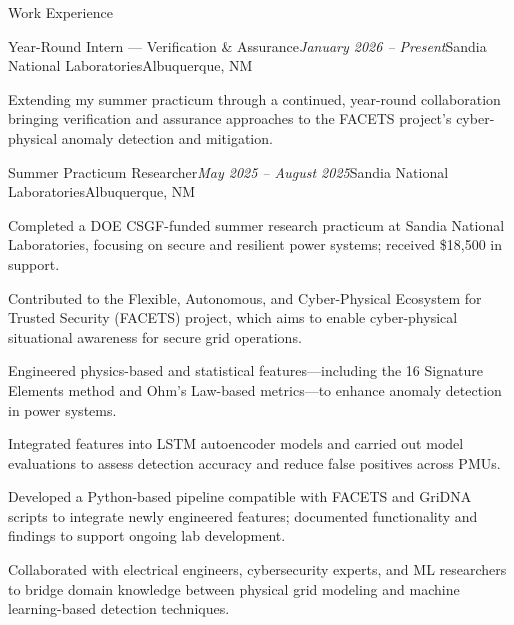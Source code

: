 \documentclass{resume}
\begin{document}

\begin{rSection}{Work Experience}

\begin{rSubsection}{Year-Round Intern — Verification \& Assurance}{\em January 2026 -- Present}{Sandia National Laboratories}{Albuquerque, NM}
\item Extending my summer practicum through a continued, year-round collaboration bringing verification and assurance approaches to the FACETS project's cyber-physical anomaly detection and mitigation.
\end{rSubsection}

\begin{rSubsection}{Summer Practicum Researcher}{\em May 2025 -- August 2025}{Sandia National Laboratories}{Albuquerque, NM}
\item Completed a DOE CSGF-funded summer research practicum at Sandia National Laboratories, focusing on secure and resilient power systems; received \$18,500 in support.
\item Contributed to the Flexible, Autonomous, and Cyber-Physical Ecosystem for Trusted Security (FACETS) project, which aims to enable cyber-physical situational awareness for secure grid operations.
\item Engineered physics-based and statistical features—including the 16 Signature Elements method and Ohm’s Law-based metrics—to enhance anomaly detection in power systems.
\item Integrated features into LSTM autoencoder models and carried out model evaluations to assess detection accuracy and reduce false positives across PMUs.
\item Developed a Python-based pipeline compatible with FACETS and GriDNA scripts to integrate newly engineered features; documented functionality and findings to support ongoing lab development.
\item Collaborated with electrical engineers, cybersecurity experts, and ML researchers to bridge domain knowledge between physical grid modeling and machine learning-based detection techniques.
\end{rSubsection}

\end{rSection}


\end{document}
